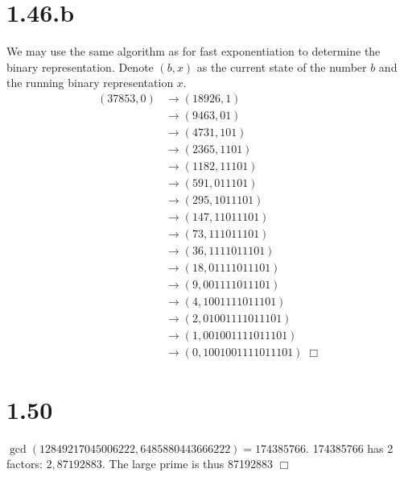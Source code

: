 \documentclass{article}
\begin{document}
\section*{1.46.b}
We may use the same algorithm as for fast exponentiation to determine the binary representation. Denote $(b,x)$ as the current state of the number $b$ and the running binary representation $x$.
\begin{equation*}
\begin{split}
(37853,0) &\to (18926,1)\\
&\to (9463, 01)\\
&\to (4731,101)\\
&\to (2365,1101)\\
&\to (1182,11101)\\
&\to (591,011101)\\
&\to (295,1011101)\\
&\to (147,11011101)\\
&\to (73,111011101)\\
&\to (36,1111011101)\\
&\to (18,01111011101)\\
&\to (9,001111011101)\\
&\to (4,1001111011101)\\
&\to (2,01001111011101)\\
&\to (1,001001111011101)\\
&\to (0,1001001111011101) \; \Box
\end{split}
\end{equation*}

\section*{1.50}
$\gcd(12849217045006222,6485880443666222) = 174385766$. 174385766 has 2 factors: $2, 87192883$. The large prime is thus 87192883 $\Box$
\end{document}
